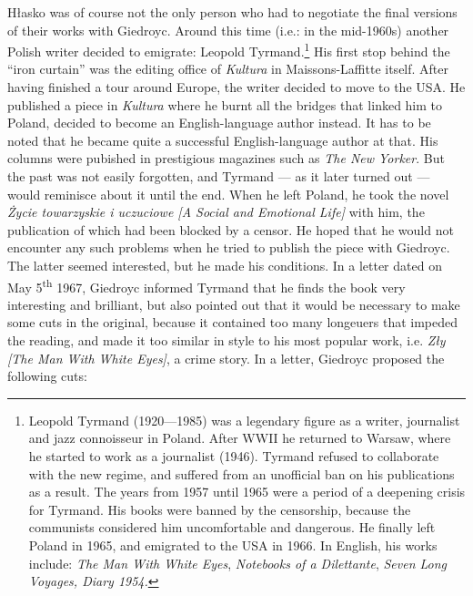 \begin{paper}
\noindent Hłasko was of course not the only person who had to negotiate the final
versions of their works with Giedroyc. Around this time (i.e.: in the mid-1960s) another Polish writer decided to emigrate: 
Leopold Tyrmand.\footnote{Leopold Tyrmand (1920---1985) was a legendary
  figure as a writer, journalist and jazz connoisseur in Poland. After
  WWII he returned to Warsaw, where he started to work as a
  journalist (1946). Tyrmand refused to collaborate with the new regime, and
  suffered from an unofficial ban on his publications as a result. The years from 1957
  until 1965 were a period of a deepening crisis for Tyrmand. His books were banned
  by the censorship, because the communists considered him uncomfortable
  and dangerous. He finally left Poland in 1965, and emigrated
  to the USA in 1966. In English, his works include: \emph{The Man With White Eyes},
  \emph{Notebooks of a Dilettante}, \emph{Seven Long Voyages, Diary
  1954.}} His first stop behind the ``iron curtain'' was the editing
office of \emph{Kultura} in Maissons-Laffitte itself. After having
finished a tour around Europe, the writer decided to move to the USA.
He published a piece in \emph{Kultura} where he burnt all the bridges
that linked him to Poland, decided to become an
English-language author instead. It has to be noted that he became quite a
successful English-language author at that. His columns were pubished in prestigious magazines such as
\emph{The New Yorker}. But the past was not easily forgotten,
and Tyrmand --- as it later turned out --- would reminisce about it
until the end. When he left Poland, he took the novel
\emph{Życie towarzyskie i uczuciowe [A Social and Emotional Life]} with him, the publication of which had been blocked by a censor. He hoped that he would not
encounter any such problems when he tried to publish the piece with Giedroyc. The
latter seemed interested, but he made his conditions. In a letter dated on May
5\textsuperscript{th} 1967, Giedroyc informed Tyrmand that he finds the book
very interesting and brilliant, but also pointed out that it would be
necessary to make some cuts in the original, because it contained too many
longeuers that impeded the reading, and made it too similar in style to his
most popular work, i.e. \emph{Zły [The Man With White Eyes]}, a
crime story. In a letter, Giedroyc proposed the following cuts:


\end{paper}
